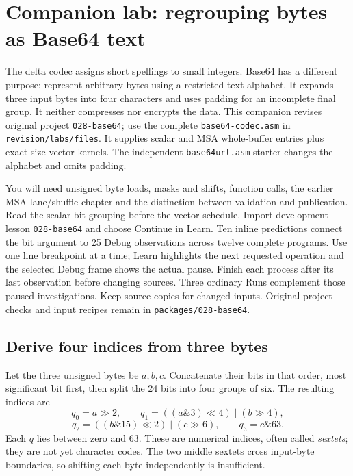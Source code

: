 \section{Companion lab: regrouping bytes as Base64 text}
\label{revision-lab:base64}

The delta codec assigns short spellings to small integers. Base64 has a different
purpose: represent arbitrary bytes using a restricted text alphabet. It expands
three input bytes into four characters and uses padding for an incomplete final
group. It neither compresses nor encrypts the data. This companion revises
original project \texttt{028-base64}; use the complete
\texttt{base64-codec.asm} in \texttt{revision/labs/files}. It supplies scalar and
MSA whole-buffer entries plus exact-size vector kernels. The independent
\texttt{base64url.asm} starter changes the alphabet and omits padding.

You will need unsigned byte loads, masks and shifts, function calls, the earlier
MSA lane/shuffle chapter and the distinction between validation and publication.
Read the scalar bit grouping before the vector schedule. Import development
lesson \texttt{028-base64} and choose Continue in Learn. Ten inline predictions
connect the bit argument to 25 Debug observations across twelve complete
programs. Use one line breakpoint at a time; Learn highlights the next requested
operation and the selected Debug frame shows the actual pause. Finish each
process after its last observation before changing sources. Three ordinary Runs
complement those paused investigations. Keep source copies for changed inputs. Original project checks and input recipes remain in
\texttt{packages/028-base64}.

\subsection*{Derive four indices from three bytes}

Let the three unsigned bytes be $a,b,c$. Concatenate their bits in that order,
most significant bit first, then split the 24 bits into four groups of six.
The resulting indices are
\[
  q_0=a\mathbin{\gg}2,\qquad
  q_1=((a\mathbin{\&}3)\mathbin{\ll}4)\mathbin{|}(b\mathbin{\gg}4),
\]
\[
  q_2=((b\mathbin{\&}15)\mathbin{\ll}2)\mathbin{|}(c\mathbin{\gg}6),\qquad
  q_3=c\mathbin{\&}63.
\]
Each $q$ lies between zero and 63. These are numerical indices, often called
\emph{sextets}; they are not yet character codes. The two middle sextets cross
input-byte boundaries, so shifting each byte independently is insufficient.

